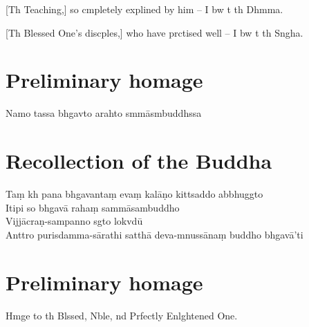 [Th Teaching,] so cmpletely explined by him --
I bw t th Dhmma. 

[Th Blessed One's discples,] who have prctised well --
I bw t th Sngha. 

\clearpage

\chapter{Preliminary homage}%

\begin{leader}
\end{leader}

Namo tassa bhgavto arahto smmāsmbuddhssa


\chapter{Recollection of the Buddha}%

\begin{leader}
\end{leader}

Taṃ kh pana bhgavantaṃ evaṃ kalāṇo kittsaddo abbhuggto\\
Itipi so bhgavā rahaṃ sammāsambuddho\\
Vijjācraṇ-sampanno sgto lokvdū\\
Anttro purisdamma-sārathi satthā deva-mnussānaṃ buddho bhgavā'ti

\clearpage

\chapter{Preliminary homage}%

\begin{leader}
\end{leader}

Hmge to th Blssed, Nble, nd Prfectly Enlghtened One.


